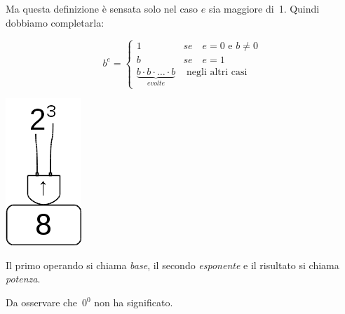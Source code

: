 Ma questa definizione è sensata solo nel caso $e$ sia maggiore di~1.
Quindi dobbiamo completarla:

\begin{inaccessibleblock}[
  \begin{definizione}
    $$
    b^e = \begin{cases}
    1 & se \quad e = 0 \text{ e } b\neq 0\\
    b & se \quad e = 1\\
    \mbox{e volte}{b \cdot b \cdot \dots \cdot b} & \mbox{ 
negli altri casi}
    \end{cases}$$
  \end{definizione}
  ]
  \begin{definizione}
    $$
    b^e = \begin{cases}
    1 & se \quad e = 0 \text{ e } b\neq 0\\
    b & se \quad e = 1\\
    \underbrace{b \cdot b \cdot \dots \cdot b}_{e volte} & 
\text{ negli altri casi}
    \end{cases}$$
  \end{definizione}
\end{inaccessibleblock}


\begin{inaccessibleblock}[]
\begin{minipage}{0.80\textwidth}
 \centering
   
\end{minipage}%
\begin{minipage}{0.15\textwidth}
 \centering
 \includegraphics[scale=0.35]{img/op_pot.png}
\end{minipage}%
\end{inaccessibleblock}

Il primo operando si chiama \emph{base}, il secondo \emph{esponente} e il 
risultato si chiama \emph{potenza}.

Da osservare che~$0^0$ non ha significato.

